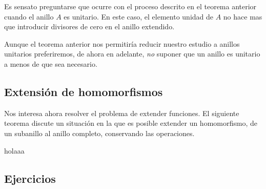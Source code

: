 Es sensato preguntarse que ocurre con el proceso descrito en el teorema anterior cuando el anillo $A$ es unitario. En este caso, el elemento unidad de $A$ no hace mas que introducir divisores de cero en el anillo extendido.

Aunque el teorema anterior nos permitiría reducir nuestro estudio a anillos unitarios preferiremos, de ahora en adelante, \textit{no} suponer que un anillo es unitario a menos de que sea necesario.
\subsection{Extensión de homomorfismos}
Nos interesa ahora resolver el problema de extender funciones. El siguiente teorema discute un situación en la que es posible extender un homomorfismo, de un subanillo al anillo completo, conservando las operaciones.
\begin{teo}
	holaaa
\end{teo}
\subsection{Ejercicios}

